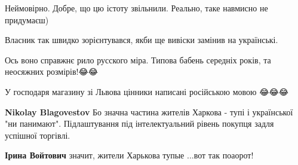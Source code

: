 \begin{itemize}
Неймовірно. Добре, що цю істоту звільнили. Реально, таке навмисно не придумаєш)

 
Власник так швидко зорієнтувався, якби ще вивіски замінив на українські.

 
Ось воно справжнє рило русского міра. Типова бабень середніх років, та неосяжних розмірів!😂😂

 
У господаря магазину зі Львова цінники написані російською мовою 😂😂😂

\begin{itemize}
 
\textbf{Nikolay Blagovestov} Бо значна частина жителів Харкова - тупі і української "ни панимают". Підлаштування під інтелектуальний рівень покупця задля успішної торгівлі.

 
\textbf{Ірина Войтович} значит, жители Харькова тупые ...вот так поаорот!

 

\end{itemize}
\end{itemize}
